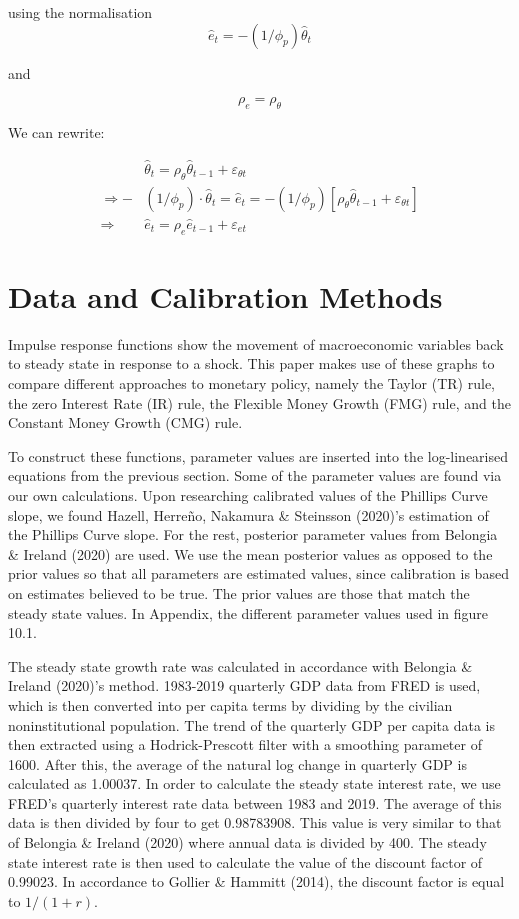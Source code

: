 \documentclass[11pt,preprint, authoryear]{elsarticle}
\numberwithin{equation}{section}
\numberwithin{figure}{section}
\numberwithin{table}{section}
\begin{document}
using the normalisation
\[\hat{e}_{t}=-\left(1 / \phi_{p}\right) \hat{\theta}_{t}\]

and

\[\rho_{e}=\rho_{\theta}\]

We can rewrite:

\[\begin{aligned}
&\hat{\theta}_{t}=\rho_{\theta} \hat{\theta}_{t-1}+\varepsilon_{\theta t}\\
\Rightarrow - & \left(1 / \phi_{p}\right) \cdot \hat{\theta}_{t} =  \hat{e}_t = -\left(1 / \phi_{p}\right) \left[ \rho_{\theta} \hat{\theta}_{t-1}+\varepsilon_{\theta t} \right]\\
\Rightarrow \quad &\hat{e}_t =  \rho_{e} \hat{e}_{t-1}+\varepsilon_{e t}
\end{aligned}\]

\newpage

\hypertarget{data-and-calibration-methods}{%
\section{Data and Calibration
Methods}\label{data-and-calibration-methods}}

Impulse response functions show the movement of macroeconomic variables
back to steady state in response to a shock. This paper makes use of
these graphs to compare different approaches to monetary policy, namely
the Taylor (TR) rule, the zero Interest Rate (IR) rule, the Flexible
Money Growth (FMG) rule, and the Constant Money Growth (CMG) rule.

To construct these functions, parameter values are inserted into the
log-linearised equations from the previous section. Some of the
parameter values are found via our own calculations. Upon researching
calibrated values of the Phillips Curve slope, we found Hazell, Herreño,
Nakamura \& Steinsson (2020)'s estimation of the Phillips Curve slope.
For the rest, posterior parameter values from Belongia \& Ireland (2020)
are used. We use the mean posterior values as opposed to the prior
values so that all parameters are estimated values, since calibration is
based on estimates believed to be true. The prior values are those that
match the steady state values. In Appendix, the different parameter
values used in figure 10.1.

The steady state growth rate was calculated in accordance with Belongia
\& Ireland (2020)'s method. 1983-2019 quarterly GDP data from FRED is
used, which is then converted into per capita terms by dividing by the
civilian noninstitutional population. The trend of the quarterly GDP per
capita data is then extracted using a Hodrick-Prescott filter with a
smoothing parameter of 1600. After this, the average of the natural log
change in quarterly GDP is calculated as 1.00037. In order to calculate
the steady state interest rate, we use FRED's quarterly interest rate
data between 1983 and 2019. The average of this data is then divided by
four to get 0.98783908. This value is very similar to that of Belongia
\& Ireland (2020) where annual data is divided by 400. The steady state
interest rate is then used to calculate the value of the discount factor
of 0.99023. In accordance to Gollier \& Hammitt (2014), the discount
factor is equal to \(1/(1+r)\).
\end{document}

